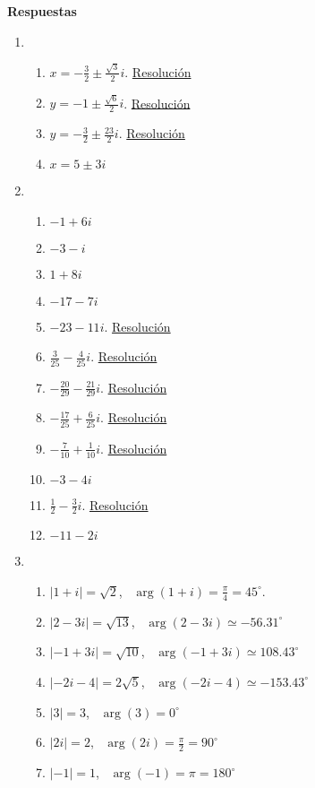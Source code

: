 \documentclass[a4paper]{article}
\newcommand{\exercise}{\item}
\newcommand{\df}[2]{\displaystyle\frac{#1}{#2}}
\begin{document}
 \textbf{Respuestas}\begin{enumerate}\exercise\begin{enumerate} [label=(\alph*)]		\item $x=-\df{3}{2} \pm \df{\sqrt{3}}{2} i$. \href{https://youtu.be/WhcMOb6DzU0}{Resolución}
		\item $y=-1 \pm \df{\sqrt{6}}{2} i$. \href{https://youtu.be/cED7hCNJGus}{Resolución}
		\item $y=-\df{3}{2} \pm \df{23}{2} i$. \href{https://youtu.be/IPSEzvEefZw}{Resolución}
		\item $x=5\pm3i$
\end{enumerate}\exercise\begin{enumerate} [label=(\alph*)]		\item $-1+6i$
		\item $-3-i$
		\item $1+8i$
		\item $-17-7i$
		\item $-23-11i$. \href{https://youtu.be/bxbLVzLAH9k}{Resolución}
		\item $\df{3}{25}-\df{4}{25}i$. \href{https://youtu.be/BarDCwpxapc}{Resolución}
		\item $-\df{20}{29}-\df{21}{29}i$. \href{https://youtu.be/UK70wbES5L8}{Resolución}
		\item $-\df{17}{25}+\df{6}{25}i$. \href{https://youtu.be/Khdqus5O4jk}{Resolución}
		\item $-\df{7}{10}+\df{1}{10}i$. \href{https://youtu.be/VguP5HyAzpQ}{Resolución}
		\item $-3-4i$
		\item $\df{1}{2}-\df{3}{2}i$. \href{https://youtu.be/edNxbzDs2wA}{Resolución}
		\item $-11-2i$
\end{enumerate}\exercise\begin{enumerate} [label=(\alph*)]		\item $|1+i|=\sqrt{2}$, ~$\arg(1+i)=\df{\pi}{4}=45^{\circ}$. 
		\item $|2-3i|=\sqrt{13}$, ~$\arg(2-3i) \simeq -56.31^{\circ}$
		\item $|-1+3i|=\sqrt{10}$, ~$\arg(-1+3i) \simeq 108.43^{\circ}$
		\item $|-2i-4|=2\sqrt{5}$, ~$\arg(-2i-4) \simeq -153.43^{\circ}$
		\item $|3|=3$, ~$\arg(3)=0^{\circ}$
		\item $|2i|=2$, ~$\arg(2i)=\df{\pi}{2}=90^{\circ}$
		\item $|-1|=1$, ~$\arg(-1)=\pi=180^{\circ}$

\end{enumerate}
\end{enumerate}
\end{document}
